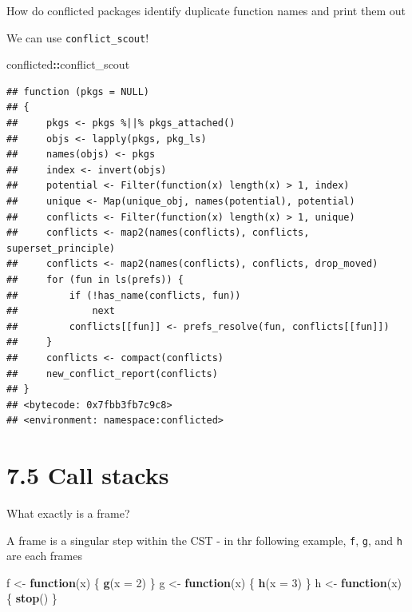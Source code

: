 \documentclass[]{book}
\newenvironment{Shaded}{\begin{snugshade}}{\end{snugshade}}
\newcommand{\ControlFlowTok}[1]{\textcolor[rgb]{0.13,0.29,0.53}{\textbf{#1}}}
\newcommand{\DataTypeTok}[1]{\textcolor[rgb]{0.13,0.29,0.53}{#1}}
\newcommand{\DecValTok}[1]{\textcolor[rgb]{0.00,0.00,0.81}{#1}}
\newcommand{\KeywordTok}[1]{\textcolor[rgb]{0.13,0.29,0.53}{\textbf{#1}}}
\newcommand{\NormalTok}[1]{#1}
\newcommand{\OperatorTok}[1]{\textcolor[rgb]{0.81,0.36,0.00}{\textbf{#1}}}
\newcommand{\StringTok}[1]{\textcolor[rgb]{0.31,0.60,0.02}{#1}}
\begin{document}
How do conflicted packages identify duplicate function names and print them out

We can use \texttt{conflict\_scout}!

\begin{Shaded}
\begin{Highlighting}[]
\NormalTok{conflicted}\OperatorTok{::}\NormalTok{conflict_scout}
\end{Highlighting}
\end{Shaded}

\begin{verbatim}
## function (pkgs = NULL) 
## {
##     pkgs <- pkgs %||% pkgs_attached()
##     objs <- lapply(pkgs, pkg_ls)
##     names(objs) <- pkgs
##     index <- invert(objs)
##     potential <- Filter(function(x) length(x) > 1, index)
##     unique <- Map(unique_obj, names(potential), potential)
##     conflicts <- Filter(function(x) length(x) > 1, unique)
##     conflicts <- map2(names(conflicts), conflicts, superset_principle)
##     conflicts <- map2(names(conflicts), conflicts, drop_moved)
##     for (fun in ls(prefs)) {
##         if (!has_name(conflicts, fun)) 
##             next
##         conflicts[[fun]] <- prefs_resolve(fun, conflicts[[fun]])
##     }
##     conflicts <- compact(conflicts)
##     new_conflict_report(conflicts)
## }
## <bytecode: 0x7fbb3fb7c9c8>
## <environment: namespace:conflicted>
\end{verbatim}

\hypertarget{call-stacks}{%
\section*{7.5 Call stacks}\label{call-stacks}}

What exactly is a frame?

A frame is a singular step within the CST - in thr following example, \texttt{f}, \texttt{g}, and \texttt{h} are each frames

\begin{Shaded}
\begin{Highlighting}[]
\NormalTok{f <-}\StringTok{ }\ControlFlowTok{function}\NormalTok{(x) \{}
  \KeywordTok{g}\NormalTok{(}\DataTypeTok{x =} \DecValTok{2}\NormalTok{)}
\NormalTok{\}}
\NormalTok{g <-}\StringTok{ }\ControlFlowTok{function}\NormalTok{(x) \{}
  \KeywordTok{h}\NormalTok{(}\DataTypeTok{x =} \DecValTok{3}\NormalTok{)}
\NormalTok{\}}
\NormalTok{h <-}\StringTok{ }\ControlFlowTok{function}\NormalTok{(x) \{}
  \KeywordTok{stop}\NormalTok{()}
\NormalTok{\}}
\end{Highlighting}
\end{Shaded}
\end{document}
